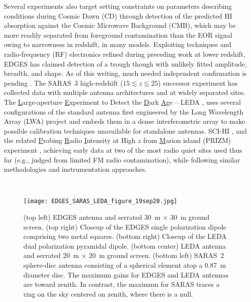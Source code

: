 Several experiments also target setting constraints on parameters describing conditions during Cosmic Dawn (CD) through detection of the predicted HI absorption against the Cosmic Microwave Background (CMB), which may be more readily separated from foreground contamination than the EOR signal owing to narrowness in redshift, in many models.  Exploiting techniques and radio-frequency (RF) electronics refined during  preceding work at lower redshift, EDGES has claimed detection of a trough \cite{bowman18} though with unlikely fitted amplitude, breadth, and shape.  As of this writing, much needed independent confirmation is pending \cite{greenhill18,hills18,bradley19,spinelli19}.  The SARAS~3 high-redshift ($15\lesssim z \lesssim 25$) successor experiment \cite{singh17,singh18} has collected data with multiple antenna architectures and at widely separated sites.  The {\underline L}arge-aperture {\underline E}xperiment to Detect the {\underline D}ark {\underline A}ge -- LEDA \cite{greenhill12,price18}, uses several configurations of the standard antenna first engineered by the Long Wavelength Array (LWA) project \cite{taylor12} and embeds them in a dense interferometric array to make possible calibration techniques  unavailable for standalone antennas.  SCI-HI \cite{voytek14}, and  the related {\underline P}robing {\underline R}adio {\underline I}ntensity at High $z$ from {\underline M}arion island (PRIZM) experiment \cite{philip19}, achieving early data at two of the most radio quiet sites used thus far (e.g., judged from limited FM radio contamination), while following similar methodologies and instrumentation approaches.

\
\begin{figure}[htb]
\begin{center}
\hspace*{-0.15in}\texttt{[image: EDGES\_SARAS\_LEDA\_figure\_19sep20.jpg]}
\end{center}
\caption{(top left) EDGES antenna and serrated 30~m $\times$ 30~m ground screen.  (top right) Closeup of the EDGES single polarization dipole comprising two metal squares.  (bottom right) Closeup of the LEDA dual polarization pyramidal dipole.  (bottom center) LEDA antenna and serrated 20~m $\times$ 20~m ground screen. (bottom left) SARAS~2 sphere-disc antenna consisting of a spherical element atop a 0.87~m diameter disc.  The maximum gains for EDGES and LEDA antennas are toward zenith.  In contrast, the maximum for SARAS traces a ring on the sky centered on zenith, where there is a null.}
\end{figure}

